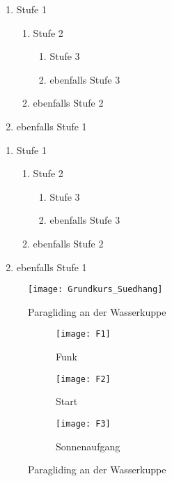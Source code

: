 \documentclass[twoside,12pt]{scrartcl}
\begin{document}
		
	\begin{enumerate}
		\item Stufe 1
		\begin{enumerate}
			\item Stufe 2
			\begin{enumerate}
				\item Stufe 3
				\item ebenfalls Stufe 3
			\end{enumerate}
			\item ebenfalls Stufe 2
		\end{enumerate}
		\item ebenfalls Stufe 1
	\end{enumerate}
	
	
	
	\begin{enumerate}[label=\emph{\arabic*)}]
		\item Stufe 1
		\begin{enumerate}[label=\emph{\alph*)}]
			\item Stufe 2
			\begin{enumerate}[label=\emph{\roman*)}]
				\item Stufe 3
				\item ebenfalls Stufe 3
			\end{enumerate}
			\item ebenfalls Stufe 2
		\end{enumerate}
		\item ebenfalls Stufe 1
	\end{enumerate}
	\Blindtext
\begin{figure}
	\centering
	\texttt{[image: Grundkurs\_Suedhang]}
	\caption{Paragliding an der Wasserkuppe}
	\label{fig:Grundkurs_Suedhang}
\end{figure}


	
\begin{figure}
	\centering
	\begin{subfigure}[t]{.3\linewidth}
		\texttt{[image: F1]}
		\caption{Funk}
		\label{fig:sub1}
	\end{subfigure}%
	\hfill
	\begin{subfigure}[t]{.3\linewidth}
		\texttt{[image: F2]}
		\caption{Start}
		\label{fig:sub2}
	\end{subfigure}
	\hfill
	\begin{subfigure}[t]{.3\linewidth}
		\texttt{[image: F3]}
		\caption{Sonnenaufgang}
		\label{fig:sub3}
	\end{subfigure}%
	\caption{Paragliding an der Wasserkuppe}
	\label{fig:paragliding}
\end{figure}
	
\end{document}
